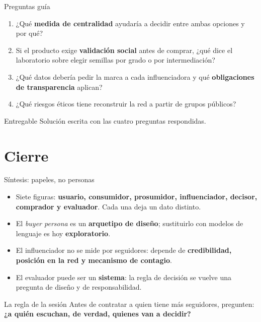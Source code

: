 \documentclass[aspectratio=169,xcolor=dvipsnames]{beamer}
\begin{document}
\begin{frame}{Preguntas guía}
\small
\begin{enumerate}
  \item ¿Qué \textbf{medida de centralidad} ayudaría a decidir entre ambas opciones y por qué?
  \vspace{3pt}
  \item Si el producto exige \textbf{validación social} antes de comprar, ¿qué dice el laboratorio sobre elegir semillas por grado o por intermediación?
  \vspace{3pt}
  \item ¿Qué datos debería pedir la marca a cada influenciadora y qué \textbf{obligaciones de transparencia} aplican?
  \vspace{3pt}
  \item ¿Qué riesgos éticos tiene reconstruir la red a partir de grupos públicos?
\end{enumerate}
\begin{alertblock}{Entregable}
  \small Solución escrita con las cuatro preguntas respondidas.
\end{alertblock}
\end{frame}

\section{Cierre}

\begin{frame}{Síntesis: papeles, no personas}
\begin{itemize}
  \small
  \item Siete figuras: \textbf{usuario, consumidor, prosumidor, influenciador, decisor, comprador y evaluador}. Cada una deja un dato distinto.
  \item El \textit{buyer persona} es un \textbf{arquetipo de diseño}; sustituirlo con modelos de lenguaje es hoy \textbf{exploratorio}.
  \item El influenciador no se mide por seguidores: depende de \textbf{credibilidad, posición en la red y mecanismo de contagio}.
  \item El evaluador puede ser un \textbf{sistema}: la regla de decisión se vuelve una pregunta de diseño y de responsabilidad.
\end{itemize}
\vspace{4pt}
\begin{alertblock}{La regla de la sesión}
  \small Antes de contratar a quien tiene más seguidores, pregunten: \textbf{¿a quién escuchan, de verdad, quienes van a decidir?}
\end{alertblock}
\end{frame}
\end{document}
